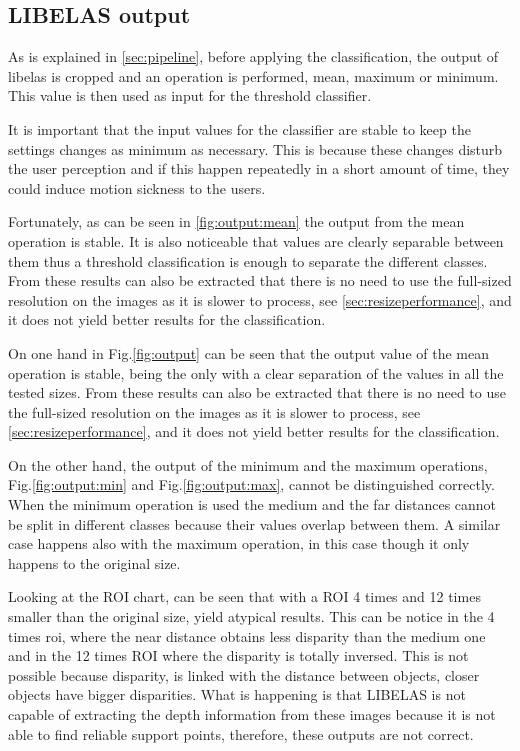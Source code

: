 \documentclass[10pt,a4paper,twocolumn,twoside]{article}
\begin{document}
	\subsection{LIBELAS output}
	As is explained in \ref{sec:pipeline}, before applying the classification, the output of libelas is cropped and an operation is performed, mean, maximum or minimum. This value is then used as input for the threshold classifier.  
	
	It is important that the input values for the classifier are stable to keep the settings changes as minimum as necessary. This is because these changes disturb the user perception and if this happen repeatedly in a short amount of time, they could induce motion sickness to the users.  
	
	Fortunately, as can be seen in \ref{fig:output:mean} the output from the mean operation is stable. It is also noticeable that values are clearly separable between them thus a threshold classification is enough to separate the different classes. From these results can also be extracted that there is no need to use the full-sized resolution on the images as it is slower to process, see \ref{sec:resizeperformance}, and it does not yield better results for the classification. 
	
	On one hand in Fig.\ref{fig:output} can be seen that the output value of the mean operation is stable, being the only with a clear separation of the values in all the tested sizes. From these results can also be extracted that there is no need to use the full-sized resolution on the images as it is slower to process, see \ref{sec:resizeperformance}, and it does not yield better results for the classification. 
	
	On the other hand, the output of the minimum and the maximum operations, Fig.\ref{fig:output:min} and Fig.\ref{fig:output:max}, cannot be distinguished correctly. When the minimum operation is used the medium and the far distances cannot be split in different classes because their values overlap between them. A similar case happens also with the maximum operation, in this case though it only happens to the original size. %
	
	Looking at the ROI chart, can be seen that with a ROI 4 times and 12 times smaller than the original size, yield atypical results. This can be notice in the 4 times roi, where the near distance obtains less disparity than the medium one and in the 12 times ROI where the disparity is totally inversed. This is not possible because disparity, is linked with the distance between objects, closer objects have bigger disparities. What is happening is that LIBELAS is not capable of extracting the depth information from these images because it is not able to find reliable support points, therefore, these outputs are not correct.
\end{document}
